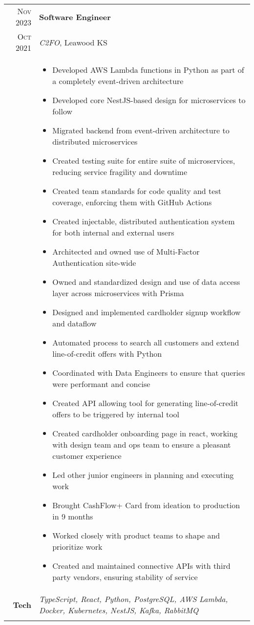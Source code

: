 \documentclass[a4paper,10pt]{article}
\newcommand{\br}{\\\multicolumn{2}{c}{}}
\begin{document}
\begin{tabular}{r|p{15cm}}
  \textsc{Nov 2023} & \textbf{Software Engineer} \\
  \textsc{Oct 2021} & \textit{C2FO}, Leawood KS
  \\ &  
       \begin{itemize}
       \item Developed AWS Lambda functions in Python as part of a completely event-driven architecture
       \item Developed core NestJS-based design for microservices to follow
       \item Migrated backend from event-driven architecture to distributed microservices
       \item Created testing suite for entire suite of microservices, reducing service fragility and downtime
       \item Created team standards for code quality and test coverage, enforcing them with GitHub Actions
       \item Created injectable, distributed authentication system for both internal and external users
       \item Architected and owned use of Multi-Factor Authentication site-wide
       \item Owned and standardized design and use of data access layer across microservices with Prisma
       \item Designed and implemented cardholder signup workflow and dataflow
       \item Automated process to search all customers and extend line-of-credit offers with Python
       \item Coordinated with Data Engineers to ensure that queries were performant and concise
       \item Created API allowing tool for generating line-of-credit offers to be triggered by internal tool
       \item Created cardholder onboarding page in react, working with design team and ops team to ensure a pleasant customer experience
       \item Led other junior engineers in planning and executing work
       \item Brought CashFlow+ Card from ideation to production in 9 months
       \item Worked closely with product teams to shape and prioritize work
       \item Created and maintained connective APIs with third party vendors, ensuring stability of service
       \end{itemize} \\
  \textbf{Tech} & \textit{TypeScript, React, Python, PostgreSQL, AWS Lambda, Docker, Kubernetes, NestJS, Kafka, RabbitMQ} \br \\
\end{tabular}
\end{document}
